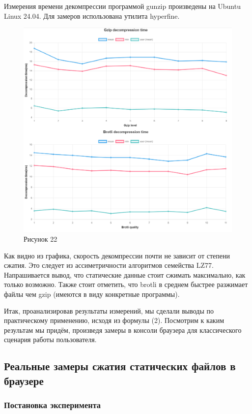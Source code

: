 \documentclass[12pt]{article}
\begin{document}
Измерения времени декомпрессии программой gunzip произведены на Ubuntu Linux 24.04. Для замеров использована утилита hyperfine.

\begin{figure}[H]
    \centering
    \includegraphics[width=1\textwidth]{../images/Decompression_time.png}
    \caption{Рисунок 22}
\end{figure}

Как видно из графика, скорость декомпрессии почти не зависит от степени сжатия. Это следует из ассиметричности алгоритмов семейства LZ77.
Напрашивается вывод, что статические данные стоит сжимать максимально, как только возможно.
Также стоит отметить, что brotli в среднем быстрее разжимает файлы чем gzip (имеются в виду конкретные программы).

Итак, проанализировав результаты измерений, мы сделали выводы по практическому применению, исходя из формулы (2).
Посмотрим к каким результам мы придём, произведя замеры в консоли браузера для классического сценария работы пользователя.

\subsection{Реальные замеры сжатия статических файлов в браузере}

\subsubsection{Постановка эксперимента}
\end{document}
